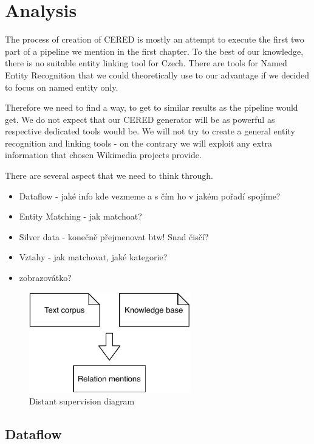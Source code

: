 \section{Analysis}

The process of creation of CERED is mostly an attempt to execute the first two part of a pipeline we mention in the first chapter. To the best of our knowledge, there is no suitable entity linking tool for Czech. There are tools for Named Entity Recognition that we could theoretically use to our advantage if we decided to focus on named entity only.

Therefore we need to find a way, to get to similar results as the pipeline would get. We do not expect that our CERED generator will be as powerful as respective dedicated tools would be. We will not try to create a general entity recognition and linking tools - on the contrary we will exploit any extra information that chosen Wikimedia projects provide. 

There are several aspect that we need to think through. 
\begin{itemize}
  \item  Dataflow - jaké info kde vezmeme a s čím ho v jakém pořadí spojíme?
  \item  Entity Matching - jak matchoat?
  \item  Silver data - konečně přejmenovat btw! Snad čisčí?
  \item  Vztahy - jak matchovat, jaké kategorie?
  \item  zobrazovátko?
\end{itemize}



\begin{figure}[h]\centering
\includegraphics[width=70mm]{./img//Diplomka diagramy-Distant supervision}
\caption{Distant supervision diagram}
\label{obr03:Nhust}
\end{figure}

\subsection{Dataflow}


